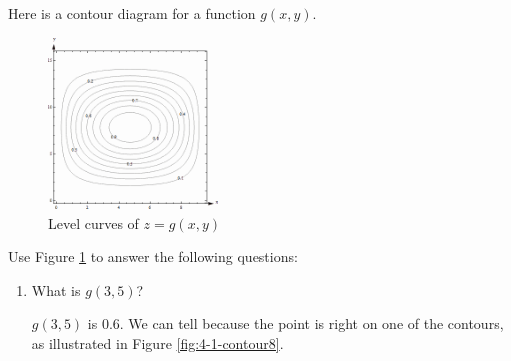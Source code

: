 \begin{example}
Here is a contour diagram for a function $g(x,y)$.

\begin{figure}[!ht]
  \centering
    \includegraphics[width=0.4\textwidth]{img/chap4/image025.png}
    \caption{Level curves of $z=g(x, y)$}
    \label{fig:4-1-contour7}
  \end{figure}
Use Figure \ref{fig:4-1-contour7} to answer the following questions:
  \begin{enumerate}[label=(\alph*)]
    \item What is $g(3,5)$?
    \begin{solution}
    $g(3,5)$ is 0.6. We can tell because the point is right on one of the contours, as illustrated in Figure \ref{fig:4-1-contour8}.


\end{solution}
\end{enumerate}
\end{example}
